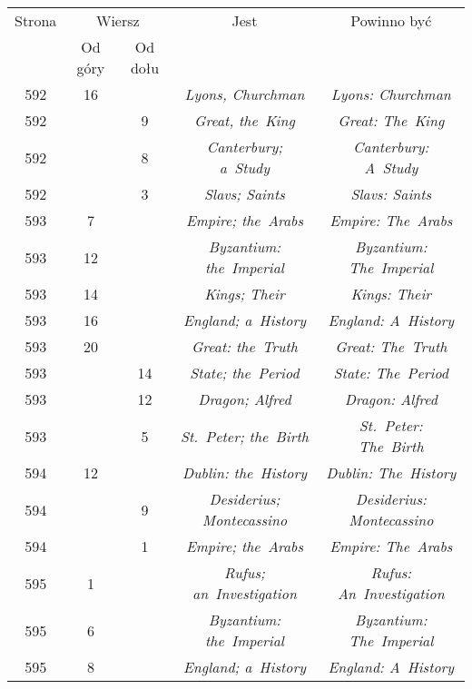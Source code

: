 \documentclass[a4paper,11pt]{article}
\begin{document}
\begin{center}
  \begin{tabular}{|c|c|c|c|c|}
    \hline
    Strona & \multicolumn{2}{c|}{Wiersz}& Jest
                              & Powinno być \\ \cline{2-3}
    & Od góry & Od dołu & & \\
    \hline
    592 & 16 & & \textit{Lyons, Churchman} & \textit{Lyons: Churchman} \\
    592 & & \hphantom{0}9 & \textit{Great, the~King}
    & \textit{Great: The~King} \\
    592 & & \hphantom{0}8 & \textit{Canterbury; a~Study}
           & \textit{Canterbury: A~Study} \\
    592 & & \hphantom{0}3 & \textit{Slavs; Saints}
    & \textit{Slavs: Saints} \\
    593 & \hphantom{0}7 & & \textit{Empire; the~Arabs}
    & \textit{Empire: The~Arabs} \\
    593 & 12 & & \textit{Byzantium: the~Imperial}
           & \textit{Byzantium: The~Imperial} \\
    593 & 14 & & \textit{Kings; Their} & \textit{Kings: Their} \\
    593 & 16 & & \textit{England; a~History}
           & \textit{England: A~History} \\
    593 & 20 & & \textit{Great: the~Truth} & \textit{Great: The~Truth} \\
    593 & & 14 & \textit{State; the~Period} & \textit{State: The~Period} \\
    593 & & 12 & \textit{Dragon; Alfred} & \textit{Dragon: Alfred} \\
    593 & & \hphantom{0}5 & \textit{St.~Peter; the~Birth}
           & \textit{St.~Peter: The~Birth} \\
    594 & 12 & & \textit{Dublin: the~History}
           & \textit{Dublin: The~History} \\
    594 & & \hphantom{0}9 & \textit{Desiderius; Montecassino}
           & \textit{Desiderius: Montecassino} \\
    594 & & \hphantom{0}1 & \textit{Empire; the~Arabs}
    & \textit{Empire: The~Arabs} \\
    595 & \hphantom{0}1 & & \textit{Rufus; an~Investigation}
           & \textit{Rufus: An~Investigation} \\
    595 & \hphantom{0}6 & & \textit{Byzantium: the~Imperial}
           & \textit{Byzantium: The~Imperial} \\
    595 & \hphantom{0}8 & & \textit{England; a~History}
           & \textit{England: A~History} \\

\end{tabular}
\end{center}
\end{document}
